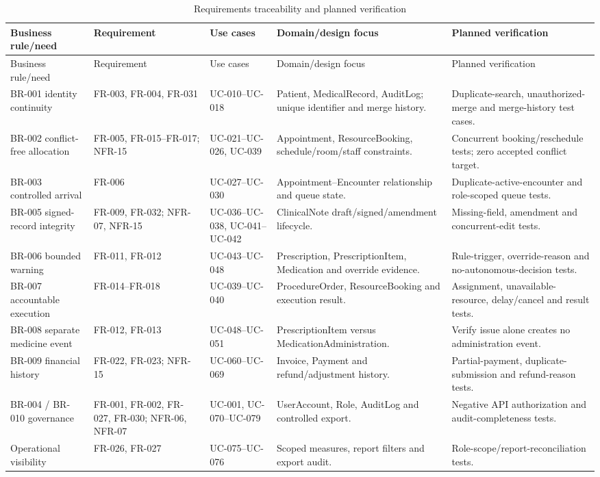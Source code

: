 \documentclass[a4paper,12pt]{article}
\begin{document}
\begingroup
\scriptsize
\renewcommand{\arraystretch}{1.14}
\begin{longtable}{@{}p{}p{}p{}p{}p{}@{}}
\caption{Requirements traceability and planned verification}\label{tab:requirements-traceability}\\
\toprule Business rule/need & Requirement & Use cases & Domain/design focus & Planned verification \\
\midrule
\endfirsthead
\toprule Business rule/need & Requirement & Use cases & Domain/design focus & Planned verification \\
\midrule
\endhead
BR-001 identity continuity & FR-003, FR-004, FR-031 & UC-010--UC-018 & Patient, MedicalRecord, AuditLog; unique identifier and merge history. & Duplicate-search, unauthorized-merge and merge-history test cases. \\
BR-002 conflict-free allocation & FR-005, FR-015--FR-017; NFR-15 & UC-021--UC-026, UC-039 & Appointment, ResourceBooking, schedule/room/staff constraints. & Concurrent booking/reschedule tests; zero accepted conflict target. \\
BR-003 controlled arrival & FR-006 & UC-027--UC-030 & Appointment--Encounter relationship and queue state. & Duplicate-active-encounter and role-scoped queue tests. \\
BR-005 signed-record integrity & FR-009, FR-032; NFR-07, NFR-15 & UC-036--UC-038, UC-041--UC-042 & ClinicalNote draft/signed/amendment lifecycle. & Missing-field, amendment and concurrent-edit tests. \\
BR-006 bounded warning & FR-011, FR-012 & UC-043--UC-048 & Prescription, PrescriptionItem, Medication and override evidence. & Rule-trigger, override-reason and no-autonomous-decision tests. \\
BR-007 accountable execution & FR-014--FR-018 & UC-039--UC-040 & ProcedureOrder, ResourceBooking and execution result. & Assignment, unavailable-resource, delay/cancel and result tests. \\
BR-008 separate medicine event & FR-012, FR-013 & UC-048--UC-051 & PrescriptionItem versus MedicationAdministration. & Verify issue alone creates no administration event. \\
BR-009 financial history & FR-022, FR-023; NFR-15 & UC-060--UC-069 & Invoice, Payment and refund/adjustment history. & Partial-payment, duplicate-submission and refund-reason tests. \\
BR-004 / BR-010 governance & FR-001, FR-002, FR-027, FR-030; NFR-06, NFR-07 & UC-001, UC-070--UC-079 & UserAccount, Role, AuditLog and controlled export. & Negative API authorization and audit-completeness tests. \\
Operational visibility & FR-026, FR-027 & UC-075--UC-076 & Scoped measures, report filters and export audit. & Role-scope/report-reconciliation tests. \\
\bottomrule
\end{longtable}
\endgroup
\end{document}
